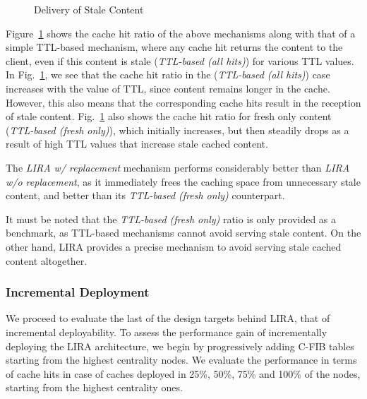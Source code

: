 \documentclass{sig-alternate}
\begin{document}
\begin{figure}[!h]
\centering
{} \vspace{-0.1cm}
\vspace{-0.2cm}
    	\caption{Delivery of Stale Content}
    	\label{fig:purging-cache-hit-ratio}
\end{figure}


Figure~\ref{fig:purging-cache-hit-ratio} shows the cache hit ratio of the above mechanisms along with 
that of a simple TTL-based mechanism, where any cache hit returns the content to the client, even if this content is stale (\textit{TTL-based (all hits)}) for various TTL values. In Fig.~\ref{fig:purging-cache-hit-ratio}, we see that the cache hit ratio in the 
(\textit{TTL-based (all hits)}) case increases with the value of TTL, since content remains longer in the 
cache. However, this also means that the corresponding cache hits result in the reception of stale 
content. Fig.~\ref{fig:purging-cache-hit-ratio} also shows the cache hit ratio for fresh only content 
(\textit{TTL-based (fresh only)}), which initially increases, but then steadily drops as a 
result of high TTL values that increase stale cached content.

The \textit{LIRA w/ replacement} mechanism performs considerably better than \textit{LIRA w/o 
replacement}, as it immediately frees the caching space from unnecessary stale content, and better 
than its \textit{TTL-based (fresh only)} counterpart.



It must be noted that the \textit{TTL-based (fresh only)} ratio is only provided as a benchmark, 
as TTL-based mechanisms cannot avoid serving stale content. 
On the other hand, LIRA provides a precise mechanism to avoid serving stale cached content altogether.

\subsubsection{Incremental Deployment}

We proceed to evaluate the last of the design targets behind LIRA, that of incremental deployability. To assess the performance gain of incrementally deploying the LIRA architecture, we begin by progressively adding C-FIB tables starting from the highest centrality nodes. We evaluate the performance in terms of cache hits in case of caches deployed in 25\%, 50\%, 75\% and 100\% of the nodes, starting from the highest centrality ones.
\end{document}
